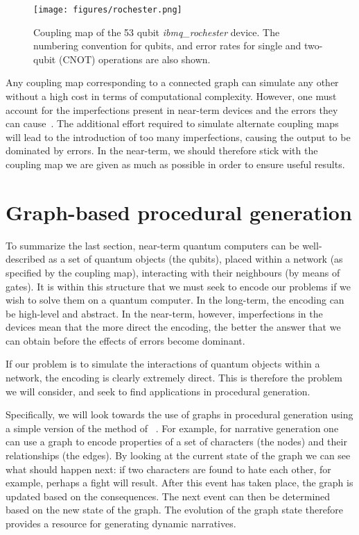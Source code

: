 \documentclass[conference]{IEEEtran}
\begin{document}
\begin{figure}[htbp]
\begin{center}
\texttt{[image: figures/rochester.png]}
\caption{Coupling map of the 53 qubit \textit{ibmq\_rochester} device. The numbering convention for qubits, and error rates for single and two-qubit (CNOT) operations are also shown.}
\label{rochester}
\end{center}
\end{figure}

Any coupling map corresponding to a connected graph can simulate any other without a high cost in terms of computational complexity. However, one must account for the imperfections present in near-term devices and the errors they can cause~\cite{mckay:19}. The additional effort required to simulate alternate coupling maps will lead to the introduction of too many imperfections, causing the output to be dominated by errors. In the near-term, we should therefore stick with the coupling map we are given as much as possible in order to ensure useful results.


\section{Graph-based procedural generation}

To summarize the last section, near-term quantum computers can be well-described as a set of quantum objects (the qubits), placed within a network (as specified by the coupling map), interacting with their neighbours (by means of gates). It is within this structure that we must seek to encode our problems if we wish to solve them on a quantum computer. In the long-term, the encoding can be high-level and abstract. In the near-term, however, imperfections in the devices mean that the more direct the encoding, the better the answer that we can obtain before the effects of errors become dominant.

If our problem is to simulate the interactions of quantum objects within a network, the encoding is clearly extremely direct. This is therefore the problem we will consider, and seek to find applications in procedural generation.

Specifically, we will look towards the use of graphs in procedural generation using a simple version of the method of ~\cite{kybartas:14,kybartas:17}. For example, for narrative generation one can use a graph to encode properties of a set of characters (the nodes) and their relationships (the edges). By looking at the current state of the graph we can see what should happen next: if two characters are found to hate each other, for example, perhaps a fight will result. After this event has taken place, the graph is updated based on the consequences. The next event can then be determined based on the new state of the graph. The evolution of the graph state therefore provides a resource for generating dynamic narratives.
\end{document}

